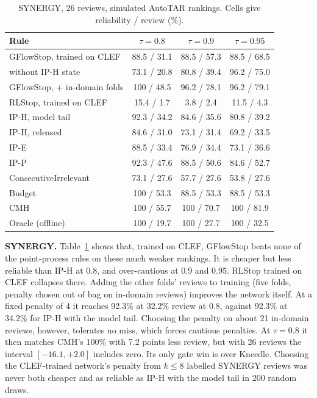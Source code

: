 \documentclass[sigconf,review,anonymous]{acmart}
\begin{document}
\begin{table}[t]
\caption{SYNERGY, 26 reviews, simulated AutoTAR rankings. Cells give reliability / review (\%).}
\label{tab:synergy}
\small
\setlength{\tabcolsep}{4pt}
\begin{tabular}{lccc}
\toprule
Rule & $\tau=0.8$ & $\tau=0.9$ & $\tau=0.95$ \\
\midrule
GFlowStop, trained on CLEF & 88.5 / 31.1 & 88.5 / 57.3 & 88.5 / 68.5 \\
\quad without IP-H state & 73.1 / 20.8 & 80.8 / 39.4 & 96.2 / 75.0 \\
GFlowStop, + in-domain folds & 100 / 48.5 & 96.2 / 78.1 & 96.2 / 79.1 \\
RLStop, trained on CLEF & 15.4 / \phantom{0}1.7 & \phantom{0}3.8 / \phantom{0}2.4 & 11.5 / \phantom{0}4.3 \\
IP-H, model tail & 92.3 / 34.2 & 84.6 / 35.6 & 80.8 / 39.2 \\
IP-H, released & 84.6 / 31.0 & 73.1 / 31.4 & 69.2 / 33.5 \\
IP-E & 88.5 / 33.4 & 76.9 / 34.4 & 73.1 / 36.6 \\
IP-P & 92.3 / 47.6 & 88.5 / 50.6 & 84.6 / 52.7 \\
ConsecutiveIrrelevant & 73.1 / 27.6 & 57.7 / 27.6 & 53.8 / 27.6 \\
Budget & 100 / 53.3 & 88.5 / 53.3 & 88.5 / 53.3 \\
CMH & 100 / 55.7 & 100 / 70.7 & 100 / 81.9 \\
Oracle (offline) & 100 / 19.7 & 100 / 27.7 & 100 / 32.5 \\
\bottomrule
\end{tabular}
\end{table}

\textbf{SYNERGY.} Table~\ref{tab:synergy} shows that, trained on CLEF, GFlowStop beats none of the point-process rules on these much weaker rankings. It is cheaper but less reliable than IP-H at 0.8, and over-cautious at 0.9 and 0.95. RLStop trained on CLEF collapses there. Adding the other folds' reviews to training (five folds, penalty chosen out of bag on in-domain reviews) improves the network itself. At a fixed penalty of 4 it reaches 92.3\% at 32.2\% review at 0.8, against 92.3\% at 34.2\% for IP-H with the model tail. Choosing the penalty on about 21 in-domain reviews, however, tolerates no miss, which forces cautious penalties. At $\tau=0.8$ it then matches CMH's 100\% with 7.2 points less review, but with 26 reviews the interval $[-16.1,+2.0]$ includes zero. Its only gate win is over Kneedle. Choosing the CLEF-trained network's penalty from $k\le8$ labelled SYNERGY reviews was never both cheaper and as reliable as IP-H with the model tail in 200 random draws.
\end{document}
